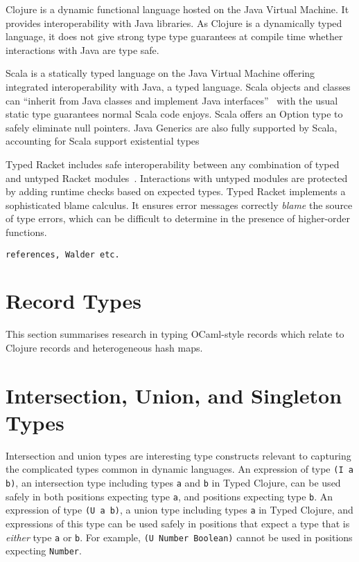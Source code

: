 Clojure is a dynamic functional language hosted on the Java Virtual Machine. It provides 
interoperability with Java libraries. As Clojure is a dynamically typed language, it does
not give strong type type guarantees at compile time whether interactions with Java
are type safe.

Scala is a statically typed language on the Java Virtual Machine offering integrated interoperability with Java, a typed language.
Scala objects and classes can ``inherit from Java classes and implement Java interfaces''~\cite{OCD+}
with the usual static type guarantees normal Scala code enjoys.
Scala offers an Option type to safely eliminate null pointers.
Java Generics are also fully supported by Scala, accounting for Scala support existential types

Typed Racket includes safe interoperability between any combination of typed and untyped 
Racket modules~\cite{Tob10,TF08}. 
Interactions with untyped modules are protected by adding runtime checks based on expected types.
Typed Racket implements a sophisticated blame calculus. It ensures 
error messages correctly \emph{blame} the source of type errors,
which can be difficult to determine in the presence of higher-order functions. 
\begin{verbatim}references, Walder etc.\end{verbatim}

\section{Record Types}

This section summarises research in typing OCaml-style records
which relate to Clojure records and heterogeneous hash maps.

\section{Intersection, Union, and Singleton Types}
\label{sec:intersectionunion}



Intersection and union types are interesting type constructs relevant to capturing the complicated
types common in dynamic languages.
An expression of type \lstinline|(I a b)|, an intersection type including types \lstinline|a|
and \lstinline|b| in Typed Clojure, can be used safely in both positions expecting type \lstinline|a|,
and positions expecting type \lstinline|b|.
An expression of type \lstinline|(U a b)|, a union type including types \lstinline|a| in Typed Clojure,
and expressions of this type can be used safely in positions 
that expect a type that is \emph{either} type \lstinline|a|
or \lstinline|b|.
For example, \lstinline|(U Number Boolean)| cannot be used in positions expecting \lstinline|Number|.

